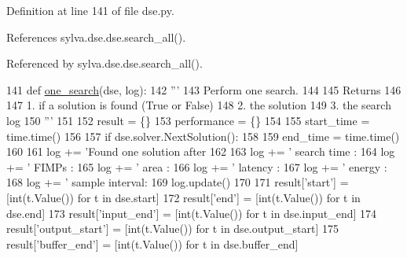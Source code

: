 Definition at line 141 of file dse.\+py.



References sylva.\+dse.\+dse.\+search\+\_\+all().



Referenced by sylva.\+dse.\+dse.\+search\+\_\+all().


\begin{DoxyCode}
141 \textcolor{keyword}{def }\hyperlink{namespacesylva_1_1dse_1_1dse_a27653b05dda8ab9dab8aa948db5b860a}{one\_search}(dse, log):
142     \textcolor{stringliteral}{'''}
143 \textcolor{stringliteral}{    Perform one search.}
144 \textcolor{stringliteral}{}
145 \textcolor{stringliteral}{    Returns}
146 \textcolor{stringliteral}{}
147 \textcolor{stringliteral}{    1. if a solution is found (True or False)}
148 \textcolor{stringliteral}{    2. the solution}
149 \textcolor{stringliteral}{    3. the search log}
150 \textcolor{stringliteral}{    '''}
151 
152     result = \{\}
153     performance = \{\}
154 
155     start\_time = time.time()
156 
157     \textcolor{keywordflow}{if} dse.solver.NextSolution():
158 
159         end\_time = time.time()
160 
161         log += \textcolor{stringliteral}{'Found one solution after %
162             %
163         log += \textcolor{stringliteral}{'  search time    : %
164         log += \textcolor{stringliteral}{'  FIMPs          : %
165         log += \textcolor{stringliteral}{'  area           : %
166         log += \textcolor{stringliteral}{'  latency        : %
167         log += \textcolor{stringliteral}{'  energy         : %
168         log += \textcolor{stringliteral}{'  sample interval: %
169         log.update()
170 
171         result[\textcolor{stringliteral}{'start'}] = [int(t.Value()) \textcolor{keywordflow}{for} t \textcolor{keywordflow}{in} dse.start]
172         result[\textcolor{stringliteral}{'end'}] = [int(t.Value()) \textcolor{keywordflow}{for} t \textcolor{keywordflow}{in} dse.end]
173         result[\textcolor{stringliteral}{'input\_end'}] = [int(t.Value()) \textcolor{keywordflow}{for} t \textcolor{keywordflow}{in} dse.input\_end]
174         result[\textcolor{stringliteral}{'output\_start'}] = [int(t.Value()) \textcolor{keywordflow}{for} t \textcolor{keywordflow}{in} dse.output\_start]
175         result[\textcolor{stringliteral}{'buffer\_end'}] = [int(t.Value()) \textcolor{keywordflow}{for} t \textcolor{keywordflow}{in} dse.buffer\_end]
}}}}}}}
\end{DoxyCode}

